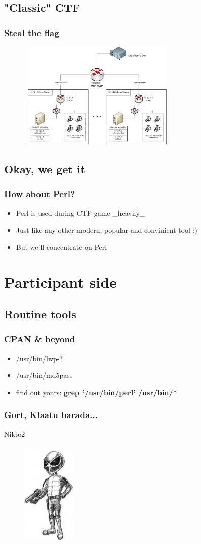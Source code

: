 \documentclass{beamer}
\begin{document}
\subsection{"Classic" CTF}
\frame
{
\frametitle{Steal the flag}
\begin{figure}
\includegraphics[width=3in,height=2in]{pics/network.png}
\end{figure}
}

\subsection{Okay, we get it}
\frame
{
\frametitle{How about Perl?}
\begin{itemize}
\item<1-> Perl is used during CTF game \_heavily\_
\item<2-> Just like any other modern, popular and convinient tool :)
\item<3-> But we'll concentrate on Perl
\end{itemize}
}

\section{Participant side}

\subsection{Routine tools}
\frame
{
\frametitle{CPAN \& beyond}
\begin{itemize}
\item<1-> /usr/bin/lwp-*
\item<1-> /usr/bin/md5pass
\item<2-> find out yours: \textbf{grep '/usr/bin/perl' /usr/bin/*}
\end{itemize}
}

\frame
{
\frametitle{Gort, Klaatu barada...}
Nikto2
\begin{figure}
\includegraphics[width=1in,height=2in]{pics/nikto.png}
\end{figure}
}
\end{document}
